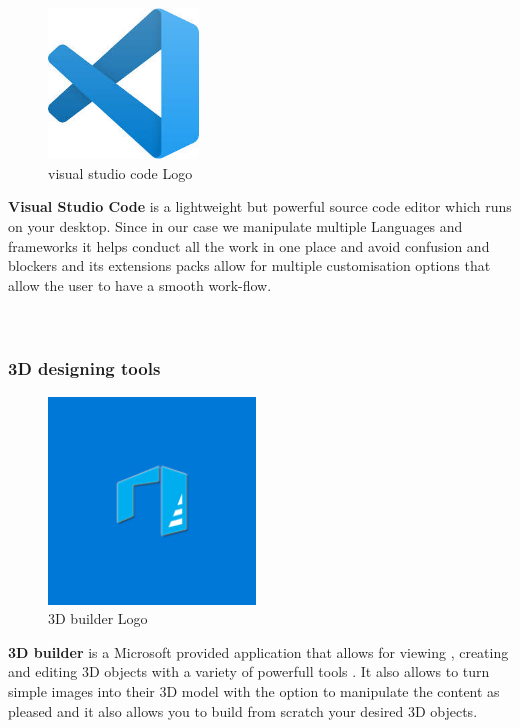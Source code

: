 \documentclass[]{report}
\begin{document}
\begin{figure}
	
	\includegraphics[width=4cm]{vscode}
	\caption{visual studio code Logo}
\end{figure}
\textbf{Visual Studio Code} is a lightweight but powerful source code editor which runs on your desktop.
Since in our case we manipulate multiple Languages and frameworks it helps conduct all the work in one place and avoid confusion and blockers and its extensions packs allow for multiple customisation options that allow the user to have a smooth work-flow.
 \\ \\\\\par 
 \subsubsection{3D designing tools}
\begin{figure}
		\includegraphics[width=5.5cm]{3dBuilder}
	\caption{3D builder Logo}
\end{figure} 


\textbf{3D builder} is a Microsoft provided application that allows for viewing , creating and editing 3D objects with a variety of powerfull tools . It also allows to turn simple images into their 3D model with the option to manipulate the content as pleased and it also allows you to build from scratch your desired 3D objects. \\\\\\\\\par
\end{document}
